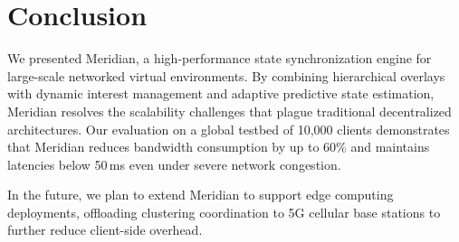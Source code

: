 \section{Conclusion}
We presented Meridian, a high-performance state synchronization engine for large-scale networked virtual environments. By combining hierarchical overlays with dynamic interest management and adaptive predictive state estimation, Meridian resolves the scalability challenges that plague traditional decentralized architectures. Our evaluation on a global testbed of 10,000 clients demonstrates that Meridian reduces bandwidth consumption by up to 60\% and maintains latencies below 50\,ms even under severe network congestion.

In the future, we plan to extend Meridian to support edge computing deployments, offloading clustering coordination to 5G cellular base stations to further reduce client-side overhead.



